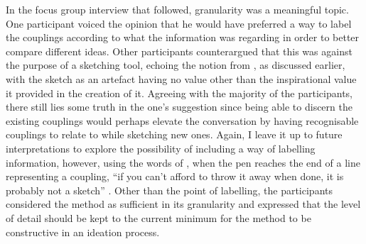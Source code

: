 In the focus group interview that followed, granularity was a meaningful topic. One participant voiced the opinion that he would have preferred a way to label the couplings according to what the information was regarding in order to better compare different ideas. Other participants counterargued that this was against the purpose of a sketching tool, echoing the notion from , as discussed earlier, with the sketch as an artefact having no value other than the inspirational value it provided in the creation of it. Agreeing with the majority of the participants, there still lies some truth in the one's suggestion since being able to discern the existing couplings would perhaps elevate the conversation by having recognisable couplings to relate to while sketching new ones. Again, I leave it up to future interpretations to explore the possibility of including a way of labelling information, however, using the words of , when the pen reaches the end of a line representing a coupling, ``if you can’t afford to throw it away when done, it is probably not a sketch'' \cite[p. 111]{buxton}. Other than the point of labelling, the participants considered the method as sufficient in its granularity and expressed that the level of detail should be kept to the current minimum for the method to be constructive in an ideation process.
